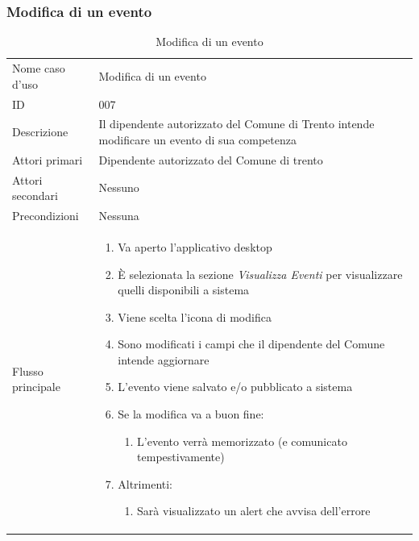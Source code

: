 \documentclass{article}
\begin{document}
\clearpage

\subsubsection{Modifica di un evento}

\begin{table}[htbp]
    \centering
    \begin{tabularx}{\textwidth}{| l | p{} |}
        \Xhline{2pt} %
        Nome caso d'uso & Modifica di un evento \\
        \Xhline{2pt} %
        ID & 007 \\
        \hline
        Descrizione & Il dipendente autorizzato del Comune di Trento intende modificare un evento di sua competenza\\
        \hline
        Attori primari & Dipendente autorizzato del Comune di trento\\
        \hline
        Attori secondari & Nessuno \\
        \hline
        Precondizioni & Nessuna \\
        \hline
        Flusso principale & 
        \begin{enumerate}[topsep=5pt,partopsep=0pt,parsep=0pt,itemsep=0pt,before=\vspace{-\baselineskip},after=\vspace{-\baselineskip}]                
            \item Va aperto l'applicativo desktop
            \item È selezionata la sezione \textit{Visualizza Eventi} per visualizzare quelli disponibili a sistema
            \item Viene scelta l'icona di modifica
            \item Sono modificati i campi che il dipendente del Comune intende aggiornare
            \item L'evento viene salvato e/o pubblicato a sistema
            \item Se la modifica va a buon fine:
            \begin{enumerate}[leftmargin=*, nosep]
                \item L'evento verrà memorizzato (e comunicato tempestivamente)
            \end{enumerate}
            \item Altrimenti:
            \begin{enumerate}[leftmargin=*, nosep]
                \item Sarà visualizzato un alert che avvisa dell'errore
            \end{enumerate}
        \end{enumerate}
        \\
        \hline
    \end{tabularx}
    \caption{Modifica di un evento}
    \label{tab:tabella_use_case007}
\end{table}
\end{document}
